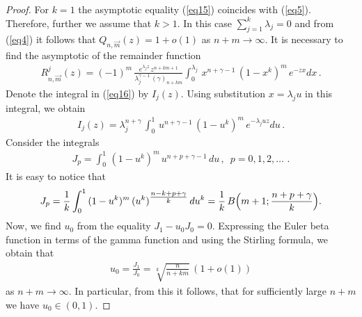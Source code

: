 \documentclass[
11pt,%
tightenlines,%
twoside,%
onecolumn,%
nofloats,%
nobibnotes,%
nofootinbib,%
superscriptaddress,%
noshowpacs,%
centertags]%
{revtex4}
\begin{document}
\begin{proof} For $k=1$ the asymptotic equality (\ref{eq15})
coincides with (\ref{eq5}). Therefore, further we assume that $k>1$.
In this case $\sum_{j=1}^k\lambda_j=0$ and from (\ref{eq4}) it follows that
$Q_{n,\overrightarrow{m}}(z)=1+o(1)$ as $n+m\rightarrow\infty$.
It is necessary to find the asymptotic of the remainder function
\begin{eqnarray}\label{eq16}
R_{n,\overrightarrow{m}}^j(z)=(-1)^m\,
\frac{e^{\lambda_jz}\,z^{n+km+1}}{\lambda_j^{\gamma-1}\,(\gamma)_{n+km}}
\int_0^{\lambda_j}\,x^{n+\gamma-1}\,(1-x^k)^m\,
e^{-zx}dx\,.
\end{eqnarray}
Denote the integral in (\ref{eq16}) by $I_j(z)$. Using substitution $x=\lambda_ju$ in this integral,
we obtain
\begin{eqnarray}\label{eq17}
I_j(z)=\lambda_j^{n+\gamma}\,\int_0^{1}\,
u^{n+\gamma-1}\,(1-u^k)^m\,e^{-\lambda_juz}du\,.
\end{eqnarray}
Consider the integrals
\begin{eqnarray*}
 J_p=\int_0^{1}\,
(1-u^k)^m\,u^{n+p+\gamma-1}\,du\,,\,\,\, p=0,1,2,\ldots\,\,.
\end{eqnarray*}
It is easy to notice that
\begin{eqnarray}\label{eq18}
 J_p=\frac{1}{k}\int_0^{1}\,
(1-u^k)^m\,(u^{k})^{\tfrac{n-k+p+\gamma}{k}}\,du^k=
\frac{1}{k}\,B\Bigl(m+1;\frac{n+p+\gamma}{k}\Bigl).
\end{eqnarray}
Now, we find $u_0$ from the equality $J_1-u_0J_0=0$.
Expressing the Euler beta function in terms of the gamma
function and using the Stirling formula, we obtain that
\begin{eqnarray*}
  u_0=\frac{J_1}{J_0}=\sqrt[k]{\frac{n}{n+km}}\,(1+o(1))
\end{eqnarray*}
as $n+m\rightarrow\infty$. In particular, from this it follows, that
for sufficiently large $n+m$ we have $u_0\in (0,1)$.


\end{proof}
\end{document}
